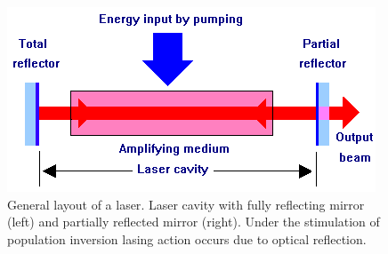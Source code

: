 \begin{figure}[ht!]
\centering
\includegraphics[scale=0.6]{chapters/img/laser_cavity.PNG}
\caption{General layout of a \acs{laser}. Laser cavity with fully reflecting mirror (left) and partially reflected mirror (right). Under the stimulation of population inversion lasing action occurs due to optical reflection.}
\label{fig:laser_cavity}
\end{figure}

